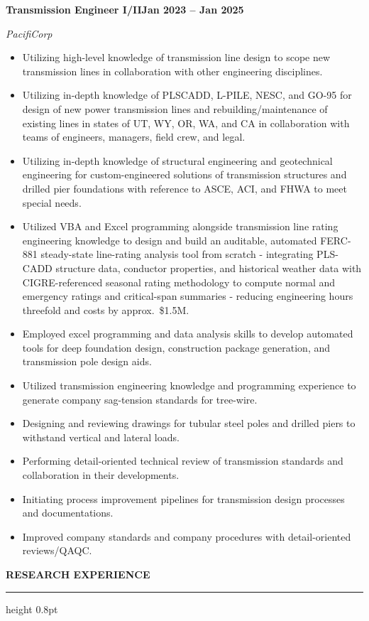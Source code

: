 \documentclass[10pt, letterpaper]{article}
\newcommand{\rsection}[1]{%
  \vspace{8pt}%
  {\large\bfseries\MakeUppercase{#1}}%
  \vspace{1pt}%
  \hrule height 0.8pt%
  \vspace{4pt}%
}
\newcommand{\jobline}[2]{%
  \vspace{5pt}%
  \noindent\textbf{#1}\hfill\textbf{#2}\par%
  \vspace{1pt}%
}
\newcommand{\subline}[1]{%
  \vspace{-1pt}%
  \noindent\textit{#1}\par%
  \vspace{1pt}%
}
\newenvironment{rlist}{%
  \begin{itemize}[leftmargin=1.4em, itemsep=1pt, topsep=2pt, parsep=0pt]%
}{%
  \end{itemize}%
}
\begin{document}
\jobline{Transmission Engineer I/II}{Jan 2023 -- Jan 2025}
\subline{PacifiCorp}
\begin{rlist}
  \item Utilizing high-level knowledge of transmission line design to scope new transmission lines in collaboration with other engineering disciplines.
  \item Utilizing in-depth knowledge of PLSCADD, L-PILE, NESC, and GO-95 for design of new power transmission lines and rebuilding/maintenance of existing lines in states of UT, WY, OR, WA, and CA in collaboration with teams of engineers, managers, field crew, and legal.
  \item Utilizing in-depth knowledge of structural engineering and geotechnical engineering for custom-engineered solutions of transmission structures and drilled pier foundations with reference to ASCE, ACI, and FHWA to meet special needs.
  \item Utilized VBA and Excel programming alongside transmission line rating engineering knowledge to design and build an auditable, automated FERC-881 steady-state line-rating analysis tool from scratch - integrating PLS-CADD structure data, conductor properties, and historical weather data with CIGRE-referenced seasonal rating methodology to compute normal and emergency ratings and critical-span summaries - reducing engineering hours threefold and costs by approx.\ \$1.5M.
  \item Employed excel programming and data analysis skills to develop automated tools for deep foundation design, construction package generation, and transmission pole design aids.
  \item Utilized transmission engineering knowledge and programming experience to generate company sag-tension standards for tree-wire.
  \item Designing and reviewing drawings for tubular steel poles and drilled piers to withstand vertical and lateral loads.
  \item Performing detail-oriented technical review of transmission standards and collaboration in their developments.
  \item Initiating process improvement pipelines for transmission design processes and documentations.
  \item Improved company standards and company procedures with detail-oriented reviews/QAQC.
\end{rlist}

\rsection{Research Experience}
\end{document}
